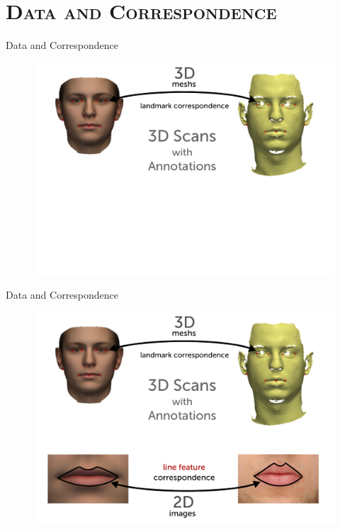 \documentclass[xcolor=x11names,compress]{beamer}
\begin{document}
    \section{\scshape Data and Correspondence}
    \begin{frame}{Data and Correspondence}
        \begin{figure}
            \includegraphics[width=.9\textwidth]{../resources/figures/givendata1.pdf}
        \end{figure}
    \end{frame}

    \begin{frame}{Data and Correspondence}
        \begin{figure}
            \includegraphics[width=.9\textwidth]{../resources/figures/givendata2.pdf}
        \end{figure}
    \end{frame}
\end{document}

